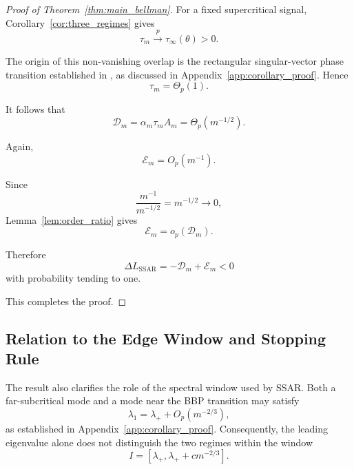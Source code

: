 \begin{proof}[Proof of Theorem~\ref{thm:main_bellman}]
For a fixed supercritical signal,
Corollary~\ref{cor:three_regimes} gives
\begin{equation}
\tau_m
\xrightarrow{p}
\tau_\infty(\theta)>0.
\end{equation}

The origin of this non-vanishing overlap is the rectangular singular-vector
phase transition established in
\cite{benaych2012singular,ding2020high}, as discussed in
Appendix~\ref{app:corollary_proof}. Hence
\begin{equation}
\tau_m
=
\Theta_p(1).
\end{equation}

It follows that
\begin{equation}
\mathcal D_m
=
\alpha_m\tau_mA_m
=
\Theta_p(m^{-1/2}).
\end{equation}

Again,
\begin{equation}
\mathcal E_m
=
O_p(m^{-1}).
\end{equation}

Since
\begin{equation}
\frac{m^{-1}}{m^{-1/2}}
=
m^{-1/2}
\rightarrow0,
\end{equation}
Lemma~\ref{lem:order_ratio} gives
\begin{equation}
\mathcal E_m
=
o_p(\mathcal D_m).
\end{equation}

Therefore
\begin{equation}
\Delta L_{\mathrm{SSAR}}
=
-\mathcal D_m+\mathcal E_m
<
0
\end{equation}
with probability tending to one.

This completes the proof.
\end{proof}


\subsection{Relation to the Edge Window and Stopping Rule}

The result also clarifies the role of the spectral window used by SSAR.
Both a far-subcritical mode and a mode near the BBP transition may satisfy
\begin{equation}
\lambda_1
=
\lambda_+
+
O_p(m^{-2/3}),
\end{equation}
as established in Appendix~\ref{app:corollary_proof}. Consequently, the
leading eigenvalue alone does not distinguish the two regimes within the
window
\begin{equation}
I
=
[\lambda_+,\lambda_++cm^{-2/3}].
\end{equation}

